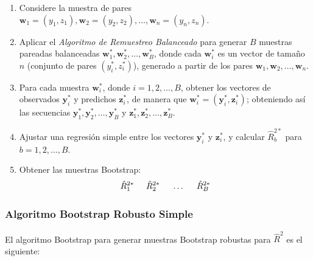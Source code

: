 \begin{enumerate}
	\item Considere la muestra de pares \( \mathbf{w}_{1} = (y_{1}, z_{1}), \mathbf{w}_{2} = (y_{2}, z_{2}), \dots, \mathbf{w}_{n} = (y_{n}, z_{n}) \).
	
	\item Aplicar el \textit{Algoritmo de Remuestreo Balanceado} para generar \( B \) muestras pareadas balanceadas \( \mathbf{w}^{*}_{1}, \mathbf{w}^{*}_{2}, \dots, \mathbf{w}^{*}_{B} \), donde cada \( \mathbf{w}^{*}_{i} \) es un vector de tamaño \( n \) (conjunto de pares \( (y_{i}^{*}, z_{i}^{*}) \)), generado a partir de los pares \( \mathbf{w}_{1}, \mathbf{w}_{2}, \dots, \mathbf{w}_{n} \).
	
	\item Para cada muestra \( \mathbf{w}^{*}_{i} \), donde \( i = 1, 2, \dots, B \), obtener los vectores de observados \( \mathbf{y}^{*}_{i} \) y predichos \( \mathbf{z}^{*}_{i} \), de manera que \( \mathbf{w}^{*}_{i} = (\mathbf{y}_{i}^{*}, \mathbf{z}_{i}^{*}) \); obteniendo así las secuencias \( \mathbf{y}_{1}^{*}, \mathbf{y}_{2}^{*}, \dots, \mathbf{y}_{B}^{*} \) y \( \mathbf{z}_{1}^{*}, \mathbf{z}_{2}^{*}, \dots, \mathbf{z}_{B}^{*} \).
	
	\item Ajustar una regresión simple entre los vectores \( \mathbf{y}^{*}_{i} \) y \( \mathbf{z}_{i}^{*} \), y calcular \( \hat{R}^{2*}_{b} \) para \( b = 1, 2, \dots, B \).
	
	\item Obtener las muestras Bootstrap:
	\[
	\hat{R}^{2*}_{1} \hspace{.5cm} \hat{R}^{2*}_{2} \hspace{.5cm} \dots \hspace{.5cm} \hat{R}^{2*}_{B}
	\]
\end{enumerate}



\subsubsection{Algoritmo Bootstrap Robusto Simple}
El algoritmo Bootstrap para generar muestras Bootstrap robustas para $\hat{R}^{2}$ es el siguiente:

